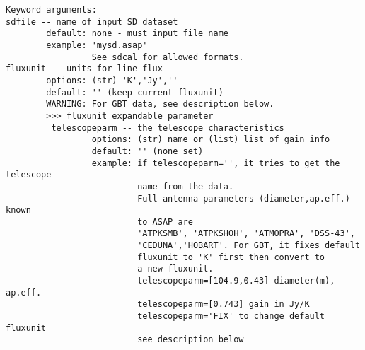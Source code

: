 \begin{verbatim}
Keyword arguments:
sdfile -- name of input SD dataset
        default: none - must input file name
        example: 'mysd.asap'
                 See sdcal for allowed formats.
fluxunit -- units for line flux
        options: (str) 'K','Jy',''
        default: '' (keep current fluxunit)
        WARNING: For GBT data, see description below.
        >>> fluxunit expandable parameter
         telescopeparm -- the telescope characteristics
                 options: (str) name or (list) list of gain info
                 default: '' (none set)
                 example: if telescopeparm='', it tries to get the telescope
                          name from the data.
                          Full antenna parameters (diameter,ap.eff.) known
                          to ASAP are
                          'ATPKSMB', 'ATPKSHOH', 'ATMOPRA', 'DSS-43',
                          'CEDUNA','HOBART'. For GBT, it fixes default 
                          fluxunit to 'K' first then convert to 
                          a new fluxunit.
                          telescopeparm=[104.9,0.43] diameter(m), ap.eff.
                          telescopeparm=[0.743] gain in Jy/K
                          telescopeparm='FIX' to change default fluxunit
                          see description below


\end{verbatim}
